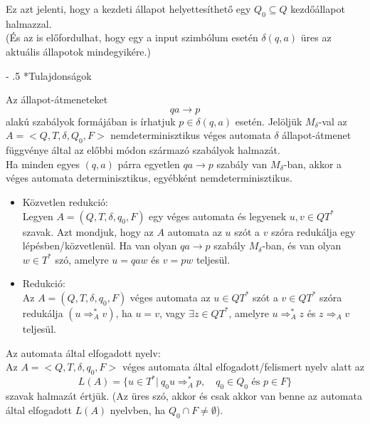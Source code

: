 \documentclass[12pt,margin=0px]{article}
\makeatletter
\renewcommand\paragraph{%
	\@startsection{paragraph}{4}{0mm}%
	{-\baselineskip}%
	{.5\baselineskip}%
	{\normalfont\normalsize\bfseries}}
\makeatother
\begin{document}
	\noindent Ez azt jelenti, hogy a kezdeti állapot helyettesíthető egy $Q_0 \subseteq Q$ kezdőállapot halmazzal.\\
	\noindent (És az is előfordulhat, hogy egy a input szimbólum esetén $\delta(q, a)$ üres az aktuális állapotok mindegyikére.)
	
    \paragraph*{Tulajdonságok}

    Az állapot-átmeneteket
	\[
        qa \rightarrow p
    \]
    alakú szabályok formájában is írhatjuk $p \in \delta(q, a) $ esetén. Jelöljük $M_\delta$-val az $A = \Big<Q, T, \delta,Q_0, F\Big>$ nemdeterminisztikus véges automata $\delta$ állapot-átmenet függvénye által az előbbi módon származó szabályok halmazát.\\
							
	\noindent Ha minden egyes $(q, a)$ párra egyetlen $qa \rightarrow p$ szabály van $M_\delta$-ban, akkor a véges automata determinisztikus, egyébként nemdeterminisztikus.
							
	\begin{itemize}
        \item Közvetlen redukció: \\
            Legyen $A = (Q, T, \delta, q_0, F)$ egy véges automata és legyenek $u, v \in QT^*$ szavak. Azt mondjuk, hogy az $A$ automata az $u$ szót a $v$ szóra redukálja egy lépésben/közvetlenül. Ha van olyan $qa \rightarrow p$ szabály $M_\delta$-ban, és van olyan $w \in T^*$ szó, amelyre $u = qaw$ és $v = pw$ teljesül.
			      						
        \item Redukció:\\
            Az $A = (Q, T, \delta, q_0, F)$ véges automata az $u \in QT^*$ szót a $v \in QT^*$ szóra redukálja $(u \Longrightarrow_A^* v)$, ha $u = v$, vagy $ \exists z \in QT^*$, amelyre $u \Longrightarrow_A^* z$ és $z \Longrightarrow_A v$ teljesül.
    \end{itemize}

    \noindent Az automata által elfogadott nyelv:\\
    \noindent Az $A = \Big<Q, T, \delta, q_0, F\Big>$ véges automata által elfogadott/felismert nyelv alatt az
    \[
        L(A) = \Big\{u \in T^* | \ q_0u \Longrightarrow_A^* p, \quad q_0 \in Q_0  \textrm{ és }  p \in F\Big\}
    \]
    szavak halmazát értjük.  (Az üres szó, akkor és csak akkor van benne az automata által elfogadott $L(A)$ nyelvben, ha $Q_0 \cap F \neq \emptyset$).\\
			      						
\end{document}

